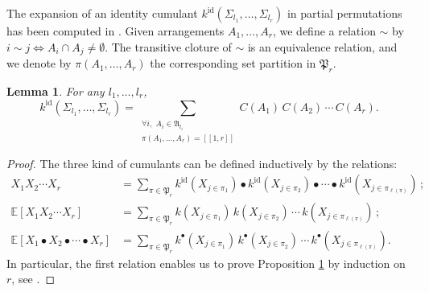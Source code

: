 \documentclass[smallextended,nospthms]{svjour3}
\newtheorem{lemma}[theorem]{Lemma}
\theoremstyle{remark}
\newcommand{\setpart}{\mathfrak{P}}
\newcommand{\esper}{\mathbb{E}}
\newcommand{\lle}{\left[\!\left[}
\newcommand{\rre}{\right]\!\right]}
\newcommand{\id}{\mathrm{id}}
\newcommand{\arra}{\mathfrak{A}}
\begin{document}
The expansion of an identity cumulant $k^{\id}(\varSigma_{l_{1}},\ldots,\varSigma_{l_{r}})$ in partial permutations has been computed in \cite[Lemma 19]{FM10}. Given arrangements $A_{1},\ldots,A_{r}$, we define a relation $\sim$ by $i \sim j \iff A_{i}\cap A_{j}\neq \emptyset$. The transitive cloture of $\sim$ is an equivalence relation, and we denote by $\pi(A_{1},\ldots,A_{r})$ the corresponding set partition in $\setpart_{r}$. 
\begin{lemma}\label{identitycumulant}
For any $l_{1},\ldots,l_{r}$,
$$k^{\id}(\varSigma_{l_{1}},\ldots,\varSigma_{l_{r}})=\sum_{\substack{\forall i,\,\,A_{i} \in \arra_{l_{i} } \\ \pi(A_{1},\ldots,A_{r})=\lle 1,r\rre }} C(A_{1})\,C(A_{2})\,\cdots\,C(A_{r}).$$
\end{lemma}
\begin{proof}
The three kind of cumulants can be defined inductively by the relations:
\begin{align*}
X_{1}X_{2}\cdots X_{r}&=\sum_{\pi \in \setpart_{r}} k^{\id}(X_{j \in \pi_{1}})\bullet k^{\id}(X_{j \in \pi_{2}})\bullet \cdots \bullet k^{\id}(X_{j \in \pi_{\ell(\pi)}})\,;\\
\esper[X_{1}X_{2}\cdots X_{r}]&=\sum_{\pi \in \setpart_{r}} k(X_{j \in \pi_{1}})\, k(X_{j \in \pi_{2}})\,\cdots \, k(X_{j \in \pi_{\ell(\pi)}})\,;\\
\esper[X_{1}\bullet X_{2}\bullet \cdots \bullet X_{r}]&=\sum_{\pi \in \setpart_{r}} k^{\bullet}(X_{j \in \pi_{1}})\, k^{\bullet}(X_{j \in \pi_{2}})\,\cdots \, k^{\bullet}(X_{j \in \pi_{\ell(\pi)}}).
\end{align*}
In particular, the first relation enables us to prove Proposition \ref{identitycumulant} by induction on $r$, see \cite[Lemma 19]{FM10}.\end{proof}
\bigskip
\end{document}
